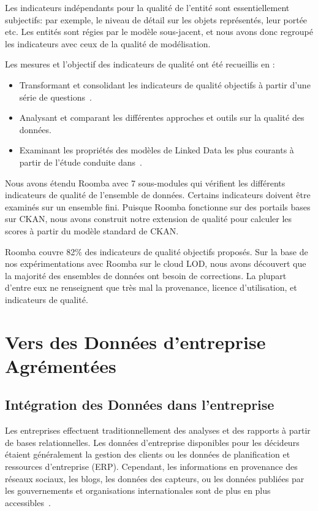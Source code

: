 Les indicateurs ind\'{e}pendants pour la qualit\'{e} de l'entit\'{e} sont essentiellement subjectifs: par exemple, le niveau de d\'{e}tail sur les objets repr\'{e}sent\'{e}s, leur port\'{e}e etc. Les entit\'{e}s sont r\'{e}gies par le mod\`{e}le sous-jacent, et nous avons donc regroup\'{e} les indicateurs avec ceux de la qualit\'{e} de mod\'{e}lisation.

Les mesures et l'objectif des indicateurs de qualit\'{e} ont \'{e}t\'{e} recueillis en :

\begin{itemize}
	\item Transformant et consolidant les indicateurs de qualit\'{e} objectifs \`{a} partir d'une s\'{e}rie de questions~\cite{Assaf:DQMST:12}.
	\item Analysant et comparant les diff\'{e}rentes approches et outils sur la qualit\'{e} des donn\'{e}es.
	\item Examinant les propri\'{e}t\'{e}s des mod\`{e}les de Linked Data les plus courants \`{a} partir de l'\'{e}tude conduite dans~\cite{Assaf:PROFILES:15}.
\end{itemize}

Nous avons \'{e}tendu Roomba avec 7 sous-modules qui v\'{e}rifient les diff\'{e}rents indicateurs de qualit\'{e} de l'ensemble de donn\'{e}es. Certains indicateurs doivent \^{e}tre examin\'{e}s sur un ensemble fini. Puisque Roomba fonctionne sur des portails bases sur CKAN, nous avons construit notre extension de qualit\'{e} pour calculer les scores \`{a} partir du mod\`{e}le standard de CKAN.

Roomba couvre 82\% des indicateurs de qualit\'{e} objectifs propos\'{e}s. Sur la base de nos exp\'{e}rimentations avec Roomba sur le cloud LOD, nous avons d\'{e}couvert que la majorit\'{e} des ensembles de donn\'{e}es ont besoin de corrections. La plupart d'entre eux ne renseignent que tr\`{e}s mal la provenance, licence d'utilisation, et indicateurs de qualit\'{e}.

\let\cleardoublepage\clearpage
\section{Vers des Donn\'{e}es d'entreprise Agr\'{e}ment\'{e}es}

\subsection{Int\'{e}gration des Donn\'{e}es dans l'entreprise}
Les entreprises effectuent traditionnellement des analyses et des rapports \`{a} partir de bases relationnelles. Les donn\'{e}es d'entreprise disponibles pour les d\'{e}cideurs \'{e}taient g\'{e}n\'{e}ralement la gestion des clients ou les donn\'{e}es de planification et ressources d'entreprise (ERP). Cependant, les informations en provenance des r\'{e}seaux sociaux, les blogs, les donn\'{e}es des capteurs, ou les donn\'{e}es publi\'{e}es par les gouvernements et organisations internationales sont de plus en plus accessibles~\cite{Boyd:Article:11}.

